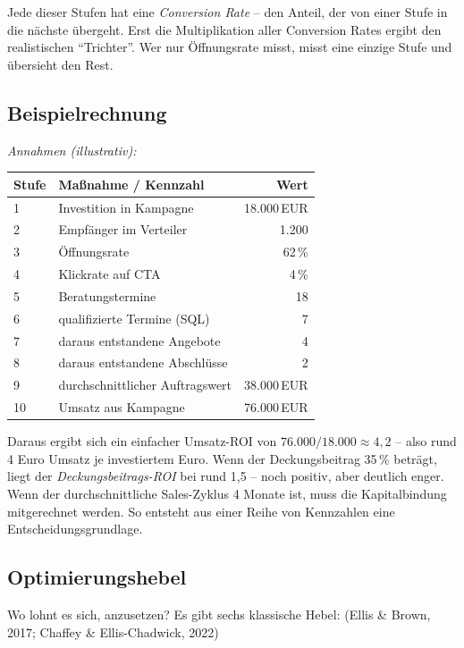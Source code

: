\documentclass[11pt,a4paper,oneside]{article}
\newcommand{\quelle}[1]{{\footnotesize\color{lpGray}(#1)}}
\begin{document}
Jede dieser Stufen hat eine \emph{Conversion Rate} -- den Anteil, der von einer Stufe in die nächste übergeht. Erst die Multiplikation aller Conversion Rates ergibt den realistischen ``Trichter''. Wer nur Öffnungsrate misst, misst eine einzige Stufe und übersieht den Rest.

\subsection{Beispielrechnung}

\noindent\emph{Annahmen (illustrativ):}

\begin{tabularx}{\linewidth}{@{}lXr@{}}
\toprule
Stufe & Maßnahme / Kennzahl & Wert \\
\midrule
1 & Investition in Kampagne & 18.000\,EUR \\
2 & Empfänger im Verteiler & 1.200 \\
3 & Öffnungsrate & 62\,\% \\
4 & Klickrate auf CTA & 4\,\% \\
5 & Beratungstermine & 18 \\
6 & qualifizierte Termine (SQL) & 7 \\
7 & daraus entstandene Angebote & 4 \\
8 & daraus entstandene Abschlüsse & 2 \\
9 & durchschnittlicher Auftragswert & 38.000\,EUR \\
10 & Umsatz aus Kampagne & 76.000\,EUR \\
\bottomrule
\end{tabularx}

\medskip
\noindent Daraus ergibt sich ein einfacher Umsatz-ROI von $76.000 / 18.000 \approx 4{,}2$ -- also rund 4 Euro Umsatz je investiertem Euro. Wenn der Deckungsbeitrag 35\,\% beträgt, liegt der \emph{Deckungsbeitrags-ROI} bei rund 1,5 -- noch positiv, aber deutlich enger. Wenn der durchschnittliche Sales-Zyklus 4 Monate ist, muss die Kapitalbindung mitgerechnet werden. So entsteht aus einer Reihe von Kennzahlen eine Entscheidungsgrundlage.

\subsection{Optimierungshebel}

Wo lohnt es sich, anzusetzen? Es gibt sechs klassische Hebel: \quelle{Ellis \& Brown, 2017; Chaffey \& Ellis-Chadwick, 2022}
\end{document}
